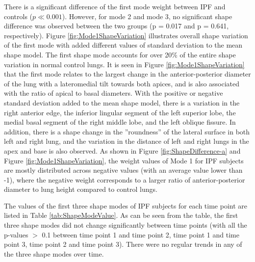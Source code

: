There is a significant difference of the first mode weight between IPF and controls ($p\ll 0.001$). However, for mode 2 and mode 3, no significant shape difference was observed between the two groups (p = 0.017 and p = 0.641, respectively). Figure \ref{fig:Mode1ShapeVariation} illustrates overall shape variation of the first mode with added different values of standard deviation to the mean shape model. The first shape mode accounts for over 20\% of the entire shape variation in normal control lungs. It is seen in Figure \ref{fig:Mode1ShapeVariation} that the first mode relates to the largest change in the anterior-posterior diameter of the lung with a lateromedial tilt towards both apices, and is also associated with the ratio of apical to basal diameters. With the positive or negative standard deviation added to the mean shape model, there is a variation in the right anterior edge, the inferior lingular segment of the left superior lobe, the medial basal segment of the right middle lobe, and the left oblique fissure. In addition, there is a shape change in the ''roundness'' of the lateral surface in both left and right lung, and the variation in the distance of left and right lungs in the apex and base is also observed. As shown in Figure \ref{fig:ShapeDifference-a} and Figure \ref{fig:Mode1ShapeVariation}, the weight values of Mode 1 for IPF subjects are mostly distributed across negative values (with an average value lower than -1), where the negative weight corresponds to a larger ratio of anterior-posterior diameter to lung height compared to control lungs. 

The values of the first three shape modes of IPF subjects for each time point are listed in Table \ref{tab:ShapeModeValue}.  As can be seen from the table, the first three shape modes did not change significantly between time points (with all the p-values $>$ 0.1 between time point 1 and time point 2, time point 1 and time point 3, time point 2 and time point 3). There were no regular trends in any of the three shape modes over time. 

